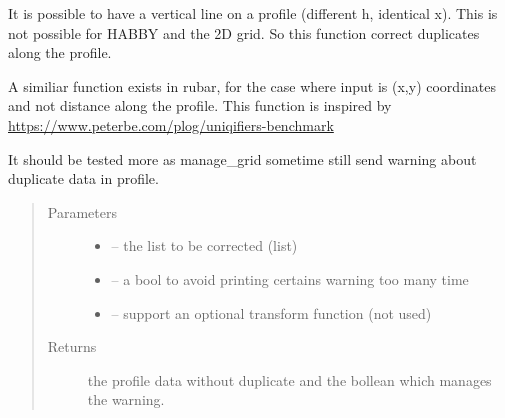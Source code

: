 \documentclass[letterpaper,10pt,english]{sphinxmanual}
\begin{document}
\begin{fulllineitems}
\label{\detokenize{index:src.mascaret.correct_duplicate}}
It is possible to have a vertical line on a profile (different h, identical x). This is not possible for HABBY and
the 2D grid. So this function correct duplicates along the profile.

A similiar function exists in rubar, for the case where input is (x,y) coordinates and not distance along the profile.
This function is inspired by \url{https://www.peterbe.com/plog/uniqifiers-benchmark}

It should be tested more as manage\_grid sometime still send warning about duplicate data in profile.
\begin{quote}\begin{description}
\item[{Parameters}] \leavevmode\begin{itemize}
\item {} 
 -- the list to be corrected (list)

\item {} 
 -- a bool to avoid printing certains warning too many time

\item {} 
 -- support an optional transform function (not used)

\end{itemize}

\item[{Returns}] \leavevmode
the profile data without duplicate and the bollean which manages the warning.

\end{description}\end{quote}

\end{fulllineitems}

\end{document}

